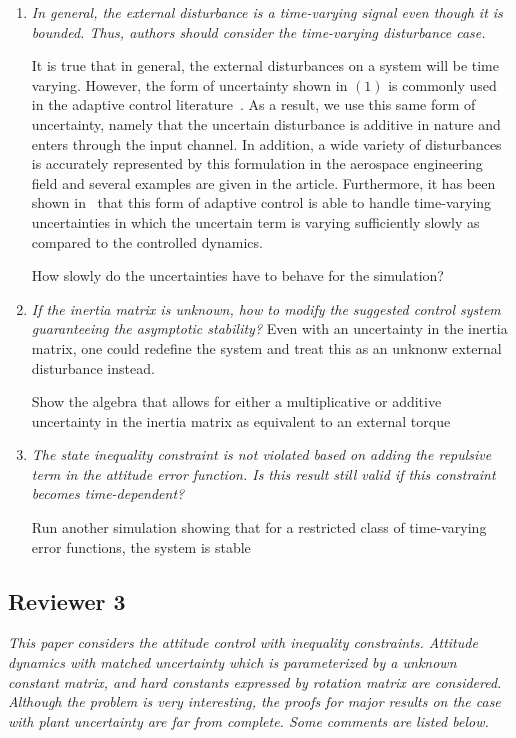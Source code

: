 \documentclass[11pt]{article}
\begin{document}
\begin{enumerate}

\item \textit{ In general, the external disturbance is a time-varying signal even though it is bounded. Thus, authors should consider the time-varying disturbance case.}

It is true that in general, the external disturbances on a system will be time varying.
However, the form of uncertainty shown in \( (1) \) is commonly used in the adaptive control literature~\cite{lee2013b,ioannou2012}.
As a result, we use this same form of uncertainty, namely that the uncertain disturbance is additive in nature and enters through the input channel.
In addition, a wide variety of disturbances is accurately represented by this formulation in the aerospace engineering field and several examples are given in the article.
Furthermore, it has been shown in~\cite{ioannou2012} that this form of adaptive control is able to handle time-varying uncertainties in which the uncertain term is varying sufficiently slowly as compared to the controlled dynamics. 

How slowly do the uncertainties have to behave for the simulation?

\item \textit{If the inertia matrix is unknown, how to modify the suggested control system guaranteeing the asymptotic stability?}
Even with an uncertainty in the inertia matrix, one could redefine the system and treat this as an unknonw external disturbance instead.

Show the algebra that allows for either a multiplicative or additive uncertainty in the inertia matrix as equivalent to an external torque

\item \textit{The state inequality constraint is not violated based on adding the repulsive term in the attitude error function. Is this result still valid if this constraint becomes time-dependent?}

Run another simulation showing that for a restricted class of time-varying error functions, the system is stable 

\end{enumerate}

\subsection*{Reviewer 3}

\textit{This paper considers the attitude control with inequality constraints. Attitude dynamics with matched uncertainty which is parameterized by a unknown constant matrix, and hard constants expressed by rotation matrix are considered. Although the problem is very interesting, the proofs for major results on the case with plant uncertainty are far from complete. Some comments are listed below.}
\end{document}
